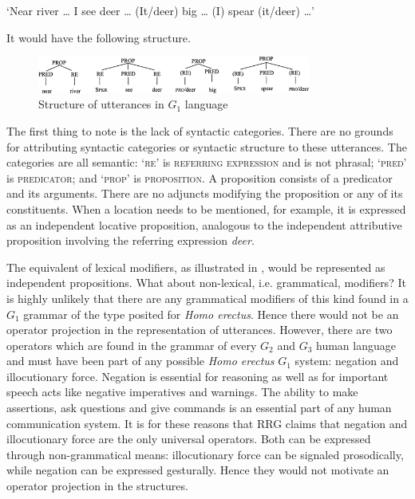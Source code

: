 \documentclass[output=paper,colorlinks,citecolor=brown]{langscibook}
\begin{document}
\ea \label{vanvalin_example_3}
‘Near river \ldots{}  I see deer \ldots{}  (It/deer) big \ldots{}  (I) spear (it/deer) \ldots ’\z

It would have the following structure.
\begin{figure}
\centering
\includegraphics[width=0.8\textwidth]{vanvalin_figure2.png}
\caption{\label{fig:fig2}Structure of utterances in $G_1$ language}
\end{figure}

The first thing to note is the lack of syntactic categories.  There are no grounds for attributing syntactic categories or syntactic structure to these utterances.  The categories are all semantic: ‘\textsc{re}’ is \textsc{referring expression} and is not phrasal; ‘\textsc{pred}’ is \textsc{predicator}; and ‘\textsc{prop}’ is \textsc{proposition}.  A proposition consists of a predicator and its arguments. There are no adjuncts modifying the proposition or any of its constituents.  When a location needs to be mentioned, for example, it is expressed as an independent locative proposition, analogous to the independent attributive proposition involving the referring expression \emph{deer}.  

The equivalent of lexical modifiers, as illustrated in , would be represented as independent propositions.  What about non-lexical, i.e. grammatical, modifiers?  It is highly unlikely that there are any grammatical modifiers of this kind found in a $G_1$ grammar of the type posited for \emph{Homo erectus}.  Hence there would not be an operator projection in the representation of utterances.  However, there are two operators which are found in the grammar of every $G_2$ and $G_3$ human language and must have been part of any possible \emph{Homo erectus} $G_1$ system: negation and illocutionary force. Negation is essential for reasoning as well as for important speech acts like negative imperatives and warnings.  The ability to make assertions, ask questions and give commands is an essential part of any human communication system.  It is for these reasons that RRG claims that negation and illocutionary force are the only universal operators.  Both can be expressed through non-grammatical means: illocutionary force can be signaled prosodically, while negation can be expressed gesturally.  Hence they would not motivate an operator projection in the structures.
\end{document}
